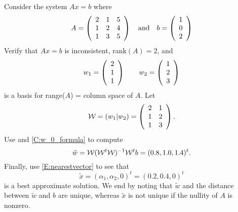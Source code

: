 \documentclass{ximera}
\begin{document}
\begin{example} \rm \label{Ex:nearest_solution}
Consider the system $Ax = b$ where 
\[
A = \left(\begin{array}{rrrrrrrrrrrrrrrrrr} 2 & 1 & 5 \\ 1 & 2 & 4\\ 1& 3 & 5 \end{array}\right)  \quad\mbox{and}\quad b = \left(\begin{array}{rrrrrrrrrrrrrrrrrr}  1\\ 0 \\ 2 \end{array}\right)
\]
Verify that $Ax = b$ is inconsistent, rank$(A) = 2$, and 
\[
w_1 = \left(\begin{array}{rrrrrrrrrrrrrrrrrr} 2 \\ 1\\ 1 \end{array}\right) \qquad w_2 = \left(\begin{array}{rrrrrrrrrrrrrrrrrr} 1 \\ 2\\ 3 \end{array}\right)
\]
is a basis for range($A$) = column space of $A$.  Let
\[
\mathcal{W} = (w_1 | w_2) = \left(\begin{array}{rrrrrrrrrrrrrrrrrr} 2 & 1 \\ 1 & 2 \\ 1 & 3 \end{array}\right).
\]
Use \Matlab and \eqref{C:w_0_formula} to compute 
\[
\tilde{w} =  \mathcal{W} (\mathcal{W}^t\mathcal{W} )^{-1} \mathcal{W}^t b = (0.8, 1.0, 1.4)^t.
\]
Finally, use \eqref{E:nearestvector} to see that
\[
\tilde{x} = (\alpha_1,\alpha_2,0)^t = (0.2, 0.4, 0)^t
\]
is a best approximate solution. We end by noting that $\tilde{w}$ and 
the distance between $\tilde{w}$ and $b$ are unique, whereas 
$\tilde{x}$ is not unique if the nullity of $A$ is nonzero. 
\end{example}


\end{document}
